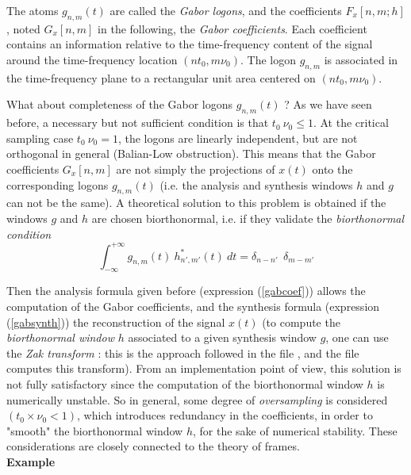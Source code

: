   The atoms $g_{n,m}(t)$ are
called the {\it Gabor logons}, and the coefficients $F_x[n,m;h]$, noted
$G_x[n,m]$ in the following, the {\it Gabor coefficients}. Each coefficient
contains an information relative to the time-frequency content of the signal
around the time-frequency location $(n t_0,m \nu_0)$.  The logon $g_{n,m}$
is associated in the time-frequency plane to a rectangular unit area
centered on $(n t_0,m \nu_0)$.

  What about completeness of the Gabor logons $g_{n,m}(t)$ ? As we have
seen before, a necessary but not sufficient condition is that $t_0\
\nu_0\leq 1$. At the critical sampling case $t_0\ \nu_0=1$, the logons are
linearly independent, but are not orthogonal in general (Balian-Low
obstruction). This means that the Gabor coefficients $G_x[n,m]$ are not
simply the projections of $x(t)$ onto the corresponding logons $g_{n,m}(t)$
(i.e. the analysis and synthesis windows $h$ and $g$ can not be the
same). A theoretical solution to this problem is obtained if the windows
$g$ and $h$ are chosen biorthonormal, i.e. if they validate the
{\it biorthonormal condition}
\[ \int_{-\infty}^{+\infty} g_{n,m}(t)\ h^*_{n',m'}(t)\ dt = \delta_{n-n'}\
\ \delta_{m-m'}\] 

  Then the analysis
formula given before (expression (\ref{gabcoef})) allows the computation of
the Gabor coefficients, and the synthesis formula (expression
(\ref{gabsynth})) the reconstruction of the signal $x(t)$ (to compute the
{\it biorthonormal window} $h$ associated to a given synthesis window $g$,
one can use the {\it Zak transform} \cite{AUS91} : this is the approach
followed in the file \index{\ttfamily tfrgabor}{\ttfamily tfrgabor}, and
the file \index{\ttfamily zak}{\ttfamily zak.m} computes this
transform). From an implementation point of view, this solution is not fully
satisfactory since the computation of the biorthonormal window $h$ is
numerically unstable. So in general, some degree of {\it oversampling} is
considered $(t_0\times \nu_0<1)$, which introduces redundancy in the
coefficients, in order to "smooth" the biorthonormal window $h$, for the
sake of numerical stability. These considerations are closely connected to
the theory of frames.\\

  {\bf Example}

